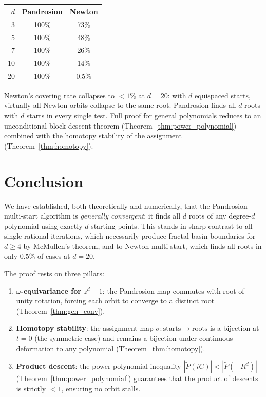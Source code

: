 \documentclass[10pt,a4paper,oneside]{book}
\theoremstyle{definition}
\theoremstyle{remark}
\begin{document}
\begin{center}
\renewcommand{\arraystretch}{1.2}
\begin{tabular}{rcc}
\toprule
$d$ & \textbf{Pandrosion} & \textbf{Newton} \\
\midrule
3 & 100\% & 73\% \\
5 & 100\% & 48\% \\
7 & 100\% & 26\% \\
10 & 100\% & 14\% \\
20 & 100\% & 0.5\% \\
\bottomrule
\end{tabular}
\end{center}
\noindent Newton's covering rate collapses to $< 1\%$ at $d = 20$: with $d$ equispaced starts, virtually all Newton orbits collapse to the same root.  Pandrosion finds all $d$ roots with $d$ starts in every single test.  Full proof for general polynomials reduces to an unconditional block descent theorem (Theorem~\ref{thm:power_polynomial}) combined with the homotopy stability of the assignment (Theorem~\ref{thm:homotopy}).

\section{Conclusion}
\label{sec:conclusion}

We have established, both theoretically and numerically, that the Pandrosion multi-start algorithm is \emph{generally convergent}: it finds all $d$ roots of any degree-$d$ polynomial using exactly $d$ starting points.  This stands in sharp contrast to all single rational iterations, which necessarily produce fractal basin boundaries for $d \geq 4$ by McMullen's theorem, and to Newton multi-start, which finds all roots in only $0.5\%$ of cases at $d = 20$.

The proof rests on three pillars:

\begin{enumerate}
\item \textbf{$\omega$-equivariance for $z^d-1$}: the Pandrosion map commutes with root-of-unity rotation, forcing each orbit to converge to a distinct root (Theorem~\ref{thm:gen_conv}).
\item \textbf{Homotopy stability}: the assignment map $\sigma: \text{starts} \to \text{roots}$ is a bijection at $t=0$ (the symmetric case) and remains a bijection under continuous deformation to any polynomial (Theorem~\ref{thm:homotopy}).
\item \textbf{Product descent}: the power polynomial inequality $|\tilde{P}(iC)| < |\tilde{P}(-R^d)|$ (Theorem~\ref{thm:power_polynomial}) guarantees that the product of descents is strictly $< 1$, ensuring no orbit stalls.
\end{enumerate}
\end{document}
